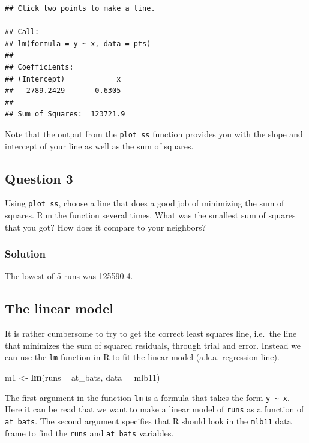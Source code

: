 \documentclass[]{article}
\newenvironment{Shaded}{\begin{snugshade}}{\end{snugshade}}
\newcommand{\KeywordTok}[1]{\textcolor[rgb]{0.13,0.29,0.53}{\textbf{#1}}}
\newcommand{\DataTypeTok}[1]{\textcolor[rgb]{0.13,0.29,0.53}{#1}}
\newcommand{\StringTok}[1]{\textcolor[rgb]{0.31,0.60,0.02}{#1}}
\newcommand{\OperatorTok}[1]{\textcolor[rgb]{0.81,0.36,0.00}{\textbf{#1}}}
\newcommand{\NormalTok}[1]{#1}
\begin{document}
\begin{verbatim}
## Click two points to make a line.
                                
## Call:
## lm(formula = y ~ x, data = pts)
## 
## Coefficients:
## (Intercept)            x  
##  -2789.2429       0.6305  
## 
## Sum of Squares:  123721.9
\end{verbatim}

Note that the output from the \texttt{plot\_ss} function provides you
with the slope and intercept of your line as well as the sum of squares.

\subsection{Question 3}\label{question-3}

Using \texttt{plot\_ss}, choose a line that does a good job of
minimizing the sum of squares. Run the function several times. What was
the smallest sum of squares that you got? How does it compare to your
neighbors?

\subsubsection{Solution}\label{solution-2}

The lowest of 5 runs was 125590.4.

\subsection{The linear model}\label{the-linear-model}

It is rather cumbersome to try to get the correct least squares line,
i.e.~the line that minimizes the sum of squared residuals, through trial
and error. Instead we can use the \texttt{lm} function in R to fit the
linear model (a.k.a. regression line).

\begin{Shaded}
\begin{Highlighting}[]
\NormalTok{m1 <-}\StringTok{ }\KeywordTok{lm}\NormalTok{(runs }\OperatorTok{~}\StringTok{ }\NormalTok{at_bats, }\DataTypeTok{data =}\NormalTok{ mlb11)}
\end{Highlighting}
\end{Shaded}

The first argument in the function \texttt{lm} is a formula that takes
the form \texttt{y\ \textasciitilde{}\ x}. Here it can be read that we
want to make a linear model of \texttt{runs} as a function of
\texttt{at\_bats}. The second argument specifies that R should look in
the \texttt{mlb11} data frame to find the \texttt{runs} and
\texttt{at\_bats} variables.
\end{document}
